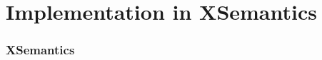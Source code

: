 \section[Xsemantics]{Implementation in XSemantics}

\begin{frame}
\frametitle{XSemantics}
\tableofcontents[currentsection]
\end{frame}